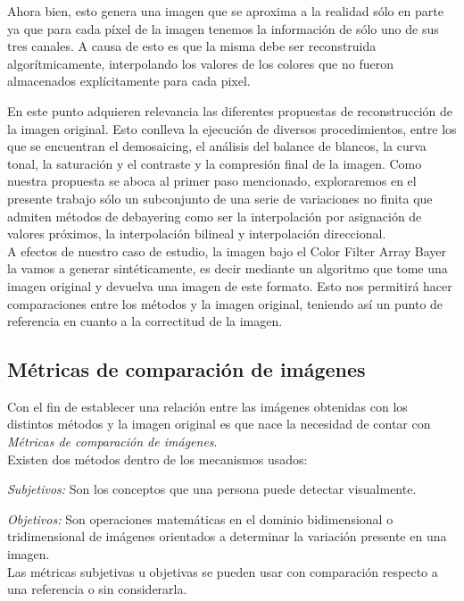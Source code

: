 \documentclass[a4paper]{article}
\begin{document}
Ahora bien, esto genera una imagen que se aproxima a la realidad sólo en parte ya que para cada p\'ixel de la imagen tenemos la informaci\'on de s\'olo uno de sus tres canales. A causa de esto es que la misma debe ser reconstruida algorítmicamente, interpolando los valores de los colores que no fueron almacenados explícitamente para cada pixel.


En este punto adquieren relevancia las diferentes propuestas de reconstrucción de la imagen original. Esto conlleva la ejecución de diversos procedimientos, entre los que se encuentran el demosaicing, el análisis del balance de blancos, la curva tonal, la saturación y el contraste y la compresión final de la imagen. Como nuestra propuesta se aboca al primer paso mencionado, exploraremos en el presente trabajo sólo un subconjunto de una serie de variaciones no finita que admiten métodos de debayering como ser la interpolación por asignación de valores próximos, la interpolación bilineal y interpolación direccional.\\

A efectos de nuestro caso de estudio, la imagen bajo el Color Filter Array Bayer la vamos a generar sint\'eticamente, es decir mediante un algoritmo que tome una imagen original y devuelva una imagen de este formato. Esto nos permitir\'a hacer comparaciones entre los m\'etodos y la imagen original, teniendo as\'i un punto de referencia en cuanto a la correctitud de la imagen.

\newpage


\newpage
\subsection{M\'etricas de comparaci\'on de im\'agenes}

Con el fin de establecer una relaci\'on entre las im\'agenes obtenidas con los distintos m\'etodos y la imagen original es que nace la necesidad de contar con \emph{M\'etricas de comparaci\'on de im\'agenes}.\\

Existen dos m\'etodos dentro de los mecanismos usados:

\emph{Subjetivos:} Son los conceptos que una persona puede detectar visualmente.

\emph{Objetivos:} Son operaciones matem\'aticas en el dominio bidimensional o tridimensional de im\'agenes orientados a determinar la variaci\'on presente en una imagen.\\

Las métricas subjetivas u objetivas se pueden usar con comparación respecto a una referencia o sin considerarla.\\
\end{document}
